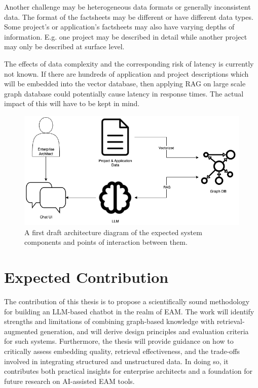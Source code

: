 \documentclass[english]{lni}
\begin{document}
Another challenge may be heterogeneous data formats or generally inconsistent data. The format of the factsheets may be different or have different data types. Some project's or application's factsheets may also have varying depths of information. E.g. one project may be described in detail while another project may only be described at surface level.

The effects of data complexity and the corresponding risk of latency is currently not known. If there are hundreds of application and project descriptions which will be embedded into the vector database, then applying RAG on large scale graph database could potentially cause latency in response times. The actual impact of this will have to be kept in mind.


\begin{figure}[h]
\centering
\includegraphics[scale=0.5]{./architecture_diagram.png}
\caption{A first draft architecture diagram of the expected system components and points of interaction between them.}
\label{fig:arch_diagram}
\end{figure}

\section{Expected Contribution}
The contribution of this thesis is to propose a scientifically sound methodology for building an LLM-based chatbot in the realm of EAM. The work will identify strengths and limitations of combining graph-based knowledge with retrieval-augmented generation, and will derive design principles and evaluation criteria for such systems. Furthermore, the thesis will provide guidance on how to critically assess embedding quality, retrieval effectiveness, and the trade-offs involved in integrating structured and unstructured data. In doing so, it contributes both practical insights for enterprise architects and a foundation for future research on AI-assisted EAM tools.
\end{document}
